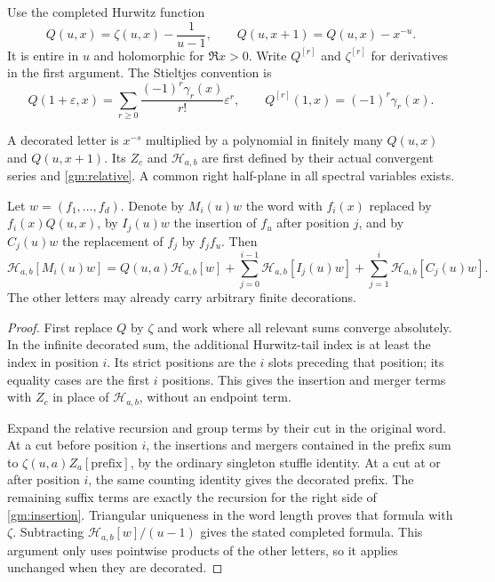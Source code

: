 Use the completed Hurwitz function
\begin{equation}\label{gm:Q}
 Q(u,x)=\zeta(u,x)-\frac1{u-1},\qquad
 Q(u,x+1)=Q(u,x)-x^{-u}.
\end{equation}
It is entire in \(u\) and holomorphic for \(\Re x>0\).
Write \(Q^{[r]}\) and \(\zeta^{[r]}\) for derivatives in the first
argument.  The Stieltjes convention is
\begin{equation}\label{gm:stieltjes}
 Q(1+\varepsilon,x)
  =\sum_{r\ge0}\frac{(-1)^r\gamma_r(x)}{r!}\varepsilon^r,
 \qquad Q^{[r]}(1,x)=(-1)^r\gamma_r(x).
\end{equation}

A decorated letter is \(x^{-s}\) multiplied by a polynomial in
finitely many \(Q(u,x)\) and \(Q(u,x+1)\).  Its \(Z_c\) and
\(\mathcal H_{a,b}\) are first defined by their actual convergent
series and \eqref{gm:relative}.  A common right half-plane in all
spectral variables exists.

\begin{lemma}
\label{gm:one-tail}
Let \(w=(f_1,\ldots,f_d)\).  Denote by \(M_i(u)w\) the word with
\(f_i(x)\) replaced by \(f_i(x)Q(u,x)\), by \(I_j(u)w\) the
insertion of \(f_u\) after position \(j\), and by \(C_j(u)w\) the
replacement of \(f_j\) by \(f_jf_u\).  Then
\begin{equation}\label{gm:insertion}
 \mathcal H_{a,b}[M_i(u)w]
 =Q(u,a)\mathcal H_{a,b}[w]
  +\sum_{j=0}^{i-1}\mathcal H_{a,b}[I_j(u)w]
  +\sum_{j=1}^{i}\mathcal H_{a,b}[C_j(u)w].
\end{equation}
The other letters may already carry arbitrary finite decorations.
\end{lemma}

\begin{proof}
First replace \(Q\) by \(\zeta\) and work where all relevant sums
converge absolutely.  In the infinite decorated sum, the additional
Hurwitz-tail index is at least the index in position \(i\).  Its strict
positions are the \(i\) slots preceding that position; its equality
cases are the first \(i\) positions.  This gives the insertion and
merger terms with \(Z_c\) in place of \(\mathcal H_{a,b}\), without
an endpoint term.

Expand the relative recursion and group terms by their cut in the
original word.  At a cut before position \(i\), the insertions and
mergers contained in the prefix sum to
\(\zeta(u,a)Z_a[\text{prefix}]\), by the ordinary singleton stuffle
identity.  At a cut at or after position \(i\), the same counting
identity gives the decorated prefix.  The remaining suffix terms are
exactly the recursion for the right side of \eqref{gm:insertion}.
Triangular uniqueness in the word length proves that formula with
\(\zeta\).  Subtracting \(\mathcal H_{a,b}[w]/(u-1)\) gives the
stated completed formula.  This argument only uses pointwise products
of the other letters, so it applies unchanged when they are decorated.
\end{proof}


